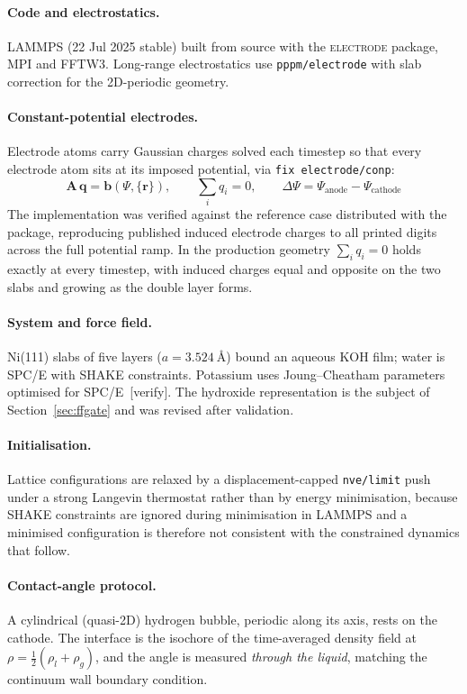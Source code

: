 \documentclass[11pt,a4paper]{article}
\newcommand{\verifyc}{\textcolor{brick}{\footnotesize[verify]}}
\begin{document}
\paragraph{Code and electrostatics.} LAMMPS (22 Jul 2025 stable) built from source with the
\textsc{electrode} package, MPI and FFTW3. Long-range electrostatics use
\texttt{pppm/electrode} with slab correction for the 2D-periodic geometry.

\paragraph{Constant-potential electrodes.} Electrode atoms carry Gaussian charges solved each
timestep so that every electrode atom sits at its imposed potential, via
\texttt{fix electrode/conp}:
\begin{equation}
\mathbf{A}\,\mathbf{q} = \mathbf{b}(\Psi,\{\mathbf{r}\}),\qquad \sum_i q_i = 0,\qquad
\Delta\Psi = \Psi_{\mathrm{anode}} - \Psi_{\mathrm{cathode}}
\end{equation}
The implementation was verified against the reference case distributed with the package,
reproducing published induced electrode charges to all printed digits across the full potential ramp.
In the production geometry $\sum_i q_i = 0$ holds exactly at every timestep, with induced charges
equal and opposite on the two slabs and growing as the double layer forms.

\paragraph{System and force field.} Ni(111) slabs of five layers ($a=\SI{3.524}{\angstrom}$) bound an
aqueous KOH film; water is SPC/E with SHAKE constraints. Potassium uses Joung--Cheatham parameters
optimised for SPC/E~\verifyc. The hydroxide representation is the subject of
Section~\ref{sec:ffgate} and was revised after validation.

\paragraph{Initialisation.} Lattice configurations are relaxed by a displacement-capped
\texttt{nve/limit} push under a strong Langevin thermostat rather than by energy minimisation,
because SHAKE constraints are ignored during minimisation in LAMMPS and a minimised configuration is
therefore not consistent with the constrained dynamics that follow.

\paragraph{Contact-angle protocol.} A cylindrical (quasi-2D) hydrogen bubble, periodic along its
axis, rests on the cathode. The interface is the isochore of the time-averaged density field at
$\rho = \tfrac12(\rho_l+\rho_g)$, and the angle is measured \emph{through the liquid}, matching the
continuum wall boundary condition.
\end{document}
